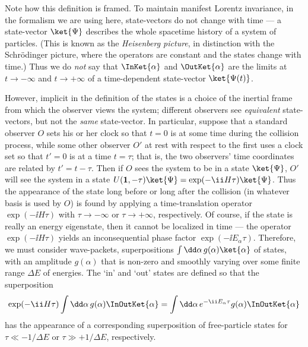 Note how this definition is framed. To maintain manifest Lorentz invariance,
in the formalism we are using here, state-vectors do not change with time ---
a state-vector $\ket{\Psi}$ describes the whole spacetime history of a system
of particles. (This is known as the \textit{Heisenberg picture}, in
distinction with the Schr\"odinger picture, where the operators are constant
and the states change with time.) Thus we do \textit{not} say that
$\InKet{\alpha}$ and $\OutKet{\alpha}$ are the
limits at $t\to-\infty$ and $t\to+\infty$ of a time-dependent state-vector
$\ket{\Psi(t)}$.

However, implicit in the definition of the states is a choice of the inertial
frame from which the observer views the system; different observers see
\textit{equivalent} state-vectors, but not the \textit{same} state-vector. In
particular, suppose that a standard observer $O$ sets his or her clock so that
$t=0$ is at some time during the collision process, while some other observer
$O'$ at rest with respect to the first uses a clock set so that $t'=0$ is at a
time $t=\tau$; that is, the two observers' time coordinates are related by
$t'=t-\tau$. Then if $O$ sees the system to be in a state $\ket{\Psi}$, $O'$
will see the system in a state
$U(\mathbf{1},-\tau)\ket{\Psi}=\exp(-\ii H\tau)\ket{\Psi}$. Thus the appearance
of the state long before or long after the collision (in whatever basis is
used by $O$) is found by applying a time-translation operator
$\exp(-\ii H\tau)$ with $\tau\to-\infty$ or $\tau\to+\infty$, respectively. Of
course, if the state is really an energy eigenstate, then it cannot be
localized in time --- the operator $\exp(-\ii H\tau)$ yields an inconsequential
phase factor $\exp(-\ii E_\alpha\tau)$. Therefore, we must consider
wave-packets, superpositions $\int \dd\alpha\,g(\alpha)\ket{\alpha}$ of states,
with an amplitude $g(\alpha)$ that is non-zero and smoothly varying over some
finite range $\Delta E$ of energies. The `in' and `out' states are defined so
that the superposition
\[
\exp(-\ii H\tau)\int \dd\alpha\,g(\alpha)
\InOutKet{\alpha}
=\int \dd\alpha\,e^{-\ii E_\alpha\tau}g(\alpha)
\InOutKet{\alpha}
\]
has the appearance of a corresponding superposition of free-particle states
for $\tau\ll-1/\Delta E$ or $\tau\gg+1/\Delta E$, respectively.

